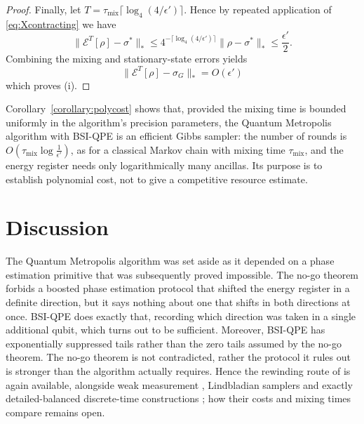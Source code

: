 \begin{proof}
Finally, let $T=\tau_{\mathrm{mix}}\lceil\log_4(4/\epsilon')\rceil$. Hence by repeated application of \eqref{eq:Xcontracting} we have
\begin{equation}
    \|\mathcal{E}^T[\rho]-\sigma^*\|_*
    \leq 4^{-\lceil\log_4(4/\epsilon')\rceil}\|\rho-\sigma^*\|_*
    \leq  \frac{\epsilon'}{2}.
\end{equation}
Combining the mixing and stationary-state errors yields
\begin{equation}
    \|\mathcal{E}^T[\rho]-\sigma_G\|_* = O(\epsilon')
\end{equation}
which proves (i).
\end{proof}

Corollary~\ref{corollary:polycost} shows that, provided the mixing time is bounded uniformly in the algorithm's precision parameters, the Quantum Metropolis algorithm with BSI-QPE is an efficient Gibbs sampler: the number of rounds is $O(\tau_{\mathrm{mix}}\log\frac{1}{\epsilon'})$, as for a classical Markov chain with mixing time $\tau_{\mathrm{mix}}$, and the energy register needs only logarithmically many ancillas. Its purpose is to establish polynomial cost, not to give a competitive resource estimate. 

\section{Discussion}
\label{section:discussion}
The Quantum Metropolis algorithm was set aside as it depended on a phase
estimation primitive that was subsequently proved impossible. The no-go theorem \cite{chen2023quantumthermalstatepreparation} forbids a boosted phase estimation protocol that shifted the energy register in a definite direction, but it says nothing about one that shifts in both directions at once. BSI-QPE does exactly that, recording which direction was taken in a single additional qubit, which turns out to be sufficient. Moreover, BSI-QPE has exponentially suppressed tails rather than the zero tails assumed by the no-go theorem. The no-go theorem is not contradicted, rather the protocol it rules out is stronger than the algorithm actually requires. Hence the rewinding route of \cite{Temme_2011} is again available, alongside weak measurement \cite{jiang2024quantummetropolissamplingweak}, Lindbladian samplers and exactly detailed-balanced discrete-time constructions \cite{gilyen2024quantum}; how their costs and mixing times compare remains open.

